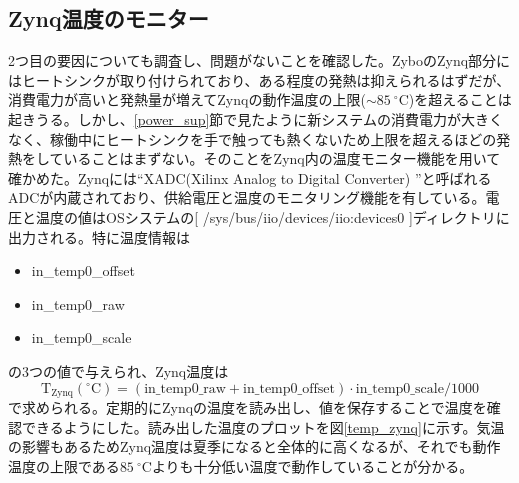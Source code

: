 \subsection{Zynq温度のモニター}
2つ目の要因についても調査し、問題がないことを確認した。ZyboのZynq部分にはヒートシンクが取り付けられており、ある程度の発熱は抑えられるはずだが、消費電力が高いと発熱量が増えてZynqの動作温度の上限($\sim\SI{85}{^{\circ}}$C)を超えることは起きうる。しかし、\ref{power_sup}節で見たように新システムの消費電力が大きくなく、稼働中にヒートシンクを手で触っても熱くないため上限を超えるほどの発熱をしていることはまずない。そのことをZynq内の温度モニター機能を用いて確かめた。Zynqには``XADC(Xilinx Analog to Digital Converter) \cite{xadc}''と呼ばれるADCが内蔵されており、供給電圧と温度のモニタリング機能を有している。電圧と温度の値はOSシステムの[ /sys/bus/iio/devices/iio:devices0 ]ディレクトリに出力される。特に温度情報は
\begin{itemize}
  \item in\_temp0\_offset
  \item in\_temp0\_raw
  \item in\_temp0\_scale
\end{itemize}
の3つの値で与えられ、Zynq温度は
\begin{equation}
  \mathrm{T}_{\mathrm{Zynq}}(^{\circ}\mathrm{C}) = (\mathrm{in\_temp0\_raw} + \mathrm{in\_temp0\_offset})\cdot \mathrm{in\_temp0\_scale} / 1000
\end{equation}
で求められる。定期的にZynqの温度を読み出し、値を保存することで温度を確認できるようにした。読み出した温度のプロットを図\ref{temp_zynq}に示す。気温の影響もあるためZynq温度は夏季になると全体的に高くなるが、それでも動作温度の上限である$\SI{85}{^{\circ}}$Cよりも十分低い温度で動作していることが分かる。


